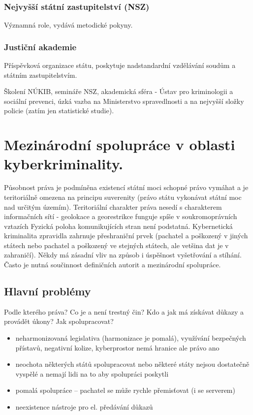 \subsubsection{Nejvyšší státní zastupitelství (NSZ)}
Významná role, vydává metodické pokyny.

\subsubsection{Justiční akademie}
Příspěvková organizace státu, poskytuje nadstandardní vzdělávání soudům a státním zastupitelstvím.

Školení NÚKIB, semináře NSZ, akademická sféra - Ústav pro kriminologii a sociální prevenci, úzká vazba na Ministerstvo spravedlnosti a na nejvyšší složky policie (zatím jen statistické studie).


\newpage
\section{Mezinárodní spolupráce v oblasti kyberkriminality.}
Působnost práva je podmíněna existencí státní moci schopné právo vymáhat a je teritoriálně omezena na principu suverenity (právo státu vykonávat státní moc nad určitým územím). Teritoriální charakter práva nesedí s charakterem informačních sítí - geolokace a georestrikce funguje spíše v soukromoprávních vztazích Fyzická poloha komunikujících stran není podstatná. Kybernetická kriminalita zpravidla zahrnuje přeshraniční prvek (pachatel a poškozený v jiných státech nebo pachatel a poškozený ve stejných státech, ale vetšina dat je v zahraničí). Někdy má zásadní vliv na způsob i úspěšnost vyšetřování a stíhání. Často je nutná součinnost definičních autorit a mezinárodní spolupráce. 

\subsection{Hlavní problémy}
Podle kterého práva? Co je a není trestný čin? Kdo a jak má získávat důkazy a provádět úkony? Jak spolupracovat?

\begin{itemize}
    \item neharmonizovaná legislativa (harmonizace je pomalá), využívání bezpečných přístavů, negativní kolize, kyberprostor nemá hranice ale právo ano
    \item neochota některých států spolupracovat nebo některé státy nejsou dostatečně vyspělé a nemají lidi na to aby spolupráci poskytli
    \item pomalá spolupráce -- pachatel se může rychle přemisťovat (i se serverem)
    \item neexistence nástroje pro el. předávání důkazů
\end{itemize}

